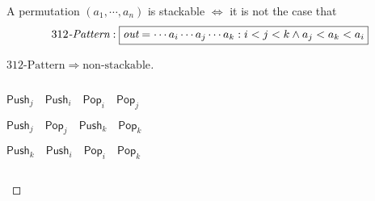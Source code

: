 \begin{frame}{}
  \begin{theorem}
    A permutation $(a_1, \cdots, a_n)$ is stackable $\iff$ it is not the case that
    \[
      312\text{\it -Pattern}: \fbox{$\texttt{\it out} = \cdots a_i \cdots a_j \cdots a_k: i < j < k \land a_j < a_k < a_i$}
    \]
  \end{theorem}

  \vspace{0.30cm}
  \begin{proof}[$312\text{-Pattern} \Longrightarrow \text{non-stackable}$]
    \begin{columns}
	\begin{description}[$j < k \land a_j < a_k$:]
	  \item[$i < j \land a_j < a_i$:] $\textsf{Push}_{j} \quad \textsf{Push}_{i} \quad \textsf{Pop}_{i} \quad \textsf{Pop}_{j}$
	  \item[$j < k \land a_j < a_k$:] $\textsf{Push}_{j} \quad \textsf{Pop}_{j} \quad \textsf{Push}_{k} \quad \textsf{Pop}_{k}$
	  \item[$i < k \land a_k < a_i$:] $\textsf{Push}_{k} \quad \textsf{Push}_{i} \quad \textsf{Pop}_{i} \quad \textsf{Pop}_{k}$
	\end{description}
    \end{columns}
  \end{proof}
\end{frame}

